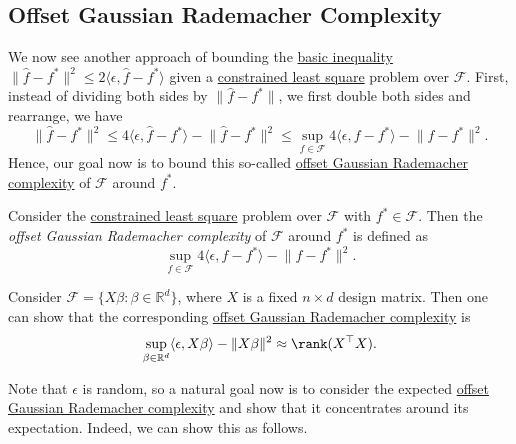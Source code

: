 \subsection{Offset Gaussian Rademacher Complexity}
We now see another approach of bounding the \hyperref[eq:basic-inequality]{basic inequality} \(\lVert \hat{f} - f^{\ast}  \rVert ^2 \leq 2 \langle \epsilon , \hat{f} - f^{\ast} \rangle \) given a \hyperref[prb:constrained-LS]{constrained least square} problem over \(\mathscr{F} \). First, instead of dividing both sides by \(\lVert \hat{f} - f^{\ast} \rVert \), we first double both sides and rearrange, we have
\[
	\lVert \hat{f} - f^{\ast}  \rVert ^2
	\leq 4 \langle \epsilon , \hat{f} - f^{\ast}  \rangle - \lVert \hat{f} - f^{\ast} \rVert ^2
	\leq \sup _{f\in \mathscr{F} } 4 \langle \epsilon , f - f^{\ast}  \rangle - \lVert f - f^{\ast}  \rVert ^2.
\]
Hence, our goal now is to bound this so-called \hyperref[def:offset-Gaussian-Rademacher-complexity]{offset Gaussian Rademacher complexity} of \(\mathscr{F} \) around \(f^{\ast} \).

\begin{definition}\label{def:offset-Gaussian-Rademacher-complexity}
	Consider the \hyperref[prb:constrained-LS]{constrained least square} problem over \(\mathscr{F} \) with \(f^{\ast} \in \mathscr{F} \). Then the \emph{offset Gaussian Rademacher complexity} of \(\mathscr{F} \) around \(f^{\ast} \) is defined as
	\[
		\sup _{f\in \mathscr{F} } 4 \langle \epsilon , f - f^{\ast}  \rangle - \lVert f - f^{\ast}  \rVert ^2 .
	\]
\end{definition}

\begin{eg}
	Consider \(\mathscr{F} = \{ X \beta \colon \beta \in \mathbb{R} ^d \} \), where \(X\) is a fixed \(n \times d\) design matrix. Then one can show that the corresponding \hyperref[def:offset-Gaussian-Rademacher-complexity]{offset Gaussian Rademacher complexity} is
	\[
		\sup _{\beta \in \mathbb{R} ^d} \langle \epsilon , X \beta  \rangle - \lVert X \beta  \rVert ^2 \approx \rank (X ^{\top} X).
	\]
\end{eg}

Note that \(\epsilon \) is random, so a natural goal now is to consider the expected \hyperref[def:offset-Gaussian-Rademacher-complexity]{offset Gaussian Rademacher complexity} and show that it concentrates around its expectation. Indeed, we can show this as follows.

